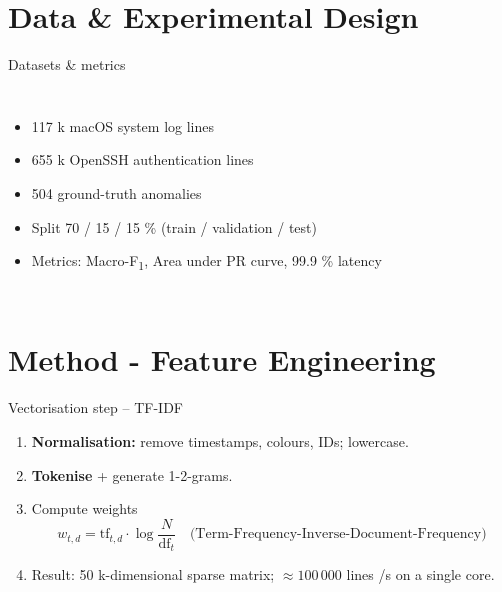 \documentclass[14pt,aspectratio=169,draft]{beamer}
\newcommand{\TFIDF}{Term-Frequency-Inverse-Document-Frequency\xspace}
\begin{document}
\section{Data \& Experimental Design}
\begin{frame}{Datasets \& metrics}
\begin{columns}
\begin{itemize}[<+->]
  \item 117 k macOS system log lines
  \item 655 k OpenSSH authentication lines
  \item 504 ground-truth anomalies
  \item Split 70 / 15 / 15 \% (train / validation / test)
  \item Metrics: Macro-F\textsubscript{1}, Area under PR curve, 99.9 \% latency
\end{itemize}

\centering
\begin{adjustbox}{max width=\linewidth}
\end{adjustbox}
\end{columns}
\end{frame}

\section{Method - Feature Engineering}
\begin{frame}{Vectorisation step  – TF-IDF}
\small
\begin{enumerate}[<+->]
  \item \textbf{Normalisation:} remove timestamps, colours, IDs; lowercase.
  \item \textbf{Tokenise} + generate 1-2-grams.
  \item Compute weights  
        \[
          w_{t,d}= \mathrm{tf}_{t,d}\cdot
          \log\frac{N}{\mathrm{df}_t}\quad\text{(\TFIDF{})}
        \]
  \item Result: 50 k-dimensional sparse matrix;  
        \(\approx 100\,000\) lines /s on a single core.
\end{enumerate}

\vspace{0.5em}
\centering
{}
\end{frame}
\end{document}
